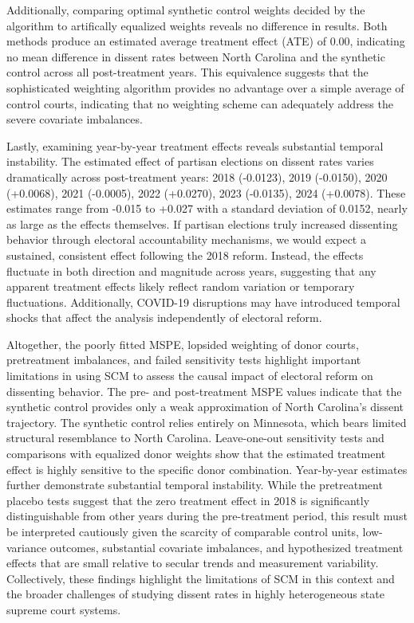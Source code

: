 Additionally, comparing optimal synthetic control weights decided by the
algorithm to artifically equalized weights reveals no difference in
results. Both methods produce an estimated average treatment effect
(ATE) of 0.00, indicating no mean difference in dissent rates between
North Carolina and the synthetic control across all post-treatment
years. This equivalence suggests that the sophisticated weighting
algorithm provides no advantage over a simple average of control courts,
indicating that no weighting scheme can adequately address the severe
covariate imbalances.

Lastly, examining year-by-year treatment effects reveals substantial
temporal instability. The estimated effect of partisan elections on
dissent rates varies dramatically across post-treatment years: 2018
(-0.0123), 2019 (-0.0150), 2020 (+0.0068), 2021 (-0.0005), 2022
(+0.0270), 2023 (-0.0135), 2024 (+0.0078). These estimates range from
-0.015 to +0.027 with a standard deviation of 0.0152, nearly as large as
the effects themselves. If partisan elections truly increased dissenting
behavior through electoral accountability mechanisms, we would expect a
sustained, consistent effect following the 2018 reform. Instead, the
effects fluctuate in both direction and magnitude across years,
suggesting that any apparent treatment effects likely reflect random
variation or temporary fluctuations. Additionally, COVID-19 disruptions
may have introduced temporal shocks that affect the analysis
independently of electoral reform.

Altogether, the poorly fitted MSPE, lopsided weighting of donor courts,
pretreatment imbalances, and failed sensitivity tests highlight
important limitations in using SCM to assess the causal impact of
electoral reform on dissenting behavior. The pre- and post-treatment
MSPE values indicate that the synthetic control provides only a weak
approximation of North Carolina's dissent trajectory. The synthetic
control relies entirely on Minnesota, which bears limited structural
resemblance to North Carolina. Leave-one-out sensitivity tests and
comparisons with equalized donor weights show that the estimated
treatment effect is highly sensitive to the specific donor combination.
Year-by-year estimates further demonstrate substantial temporal
instability. While the pretreatment placebo tests suggest that the zero
treatment effect in 2018 is significantly distinguishable from other
years during the pre-treatment period, this result must be interpreted
cautiously given the scarcity of comparable control units, low-variance
outcomes, substantial covariate imbalances, and hypothesized treatment
effects that are small relative to secular trends and measurement
variability. Collectively, these findings highlight the limitations of
SCM in this context and the broader challenges of studying dissent rates
in highly heterogeneous state supreme court systems.


